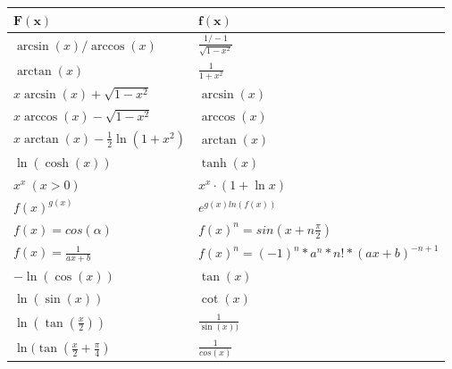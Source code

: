 \documentclass[8pt]{extarticle}
\begin{document}
\begin{multicols*}{3}
\begin{center}
\begin{tabularx}{\linewidth}{c>{\centering\arraybackslash}Xc}
  \end{tabularx}
\end{center}

\begin{center}
  \begin{tabularx}{\linewidth}{>{\centering\arraybackslash}X>{\centering\arraybackslash}X}
  
  $\mathbf{F(x)}$ & $\mathbf{f(x)}$ \\
  \midrule
  $\arcsin(x) / \arccos(x)$ & $\frac{1 / -1}{\sqrt{1 - x^2}}$ \\
  $\arctan(x)$ & $\frac{1}{1 + x^2}$ \\ 

  $x\arcsin(x) + \sqrt{1 - x^2}$ & $\arcsin(x)$\\
  $x\arccos(x) - \sqrt{1 - x^2}$ & $\arccos(x)$\\
  $x\arctan(x) - \frac{1}{2}\ln(1+x^2)$ & $\arctan(x)$\\
  $\ln(\cosh(x))$ & $\tanh(x)$\\

   
  $x^x \ (x > 0)$ & $x^x \cdot (1 + \ln{x})$ \\
$f(x)^{g(x)}$ & $e^{g(x) ln(f(x))}$\\
$f(x) = cos(\alpha)$ & $f(x)^n = sin(x + n\frac{\pi}{2})$\\
$f(x) = \frac{1}{ax + b}$ & $f(x)^n = (-1)^n * a^n * n! * (ax + b)^{-n+1}$\\
  $-\ln(\cos(x))$ & $\tan(x)$\\
  $\ln(\sin(x))$ & $\cot(x)$\\
  $\ln(\tan(\frac{x}{2}))$ & $\frac{1}{\sin(x))}$\\
  $\ln{(\tan(\frac{x}{2} + \frac{\pi}{4})}$ & $\frac{1}{cos(x)}$\\

  \bottomrule
  \end{tabularx}
\end{center}
\begin{center}
 \begin{tabularx}{\linewidth}{>{\centering\arraybackslash}X>{\centering\arraybackslash}X}
  

\end{tabularx}
\end{center}
\end{multicols*}
\end{document}
